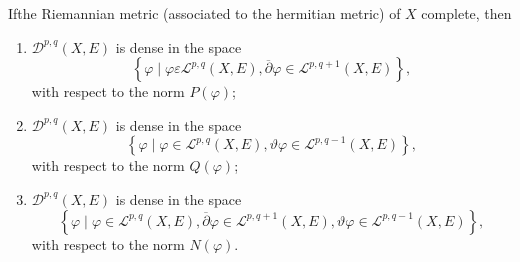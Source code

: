 \setcounter{theorem}{0}
\begin{theorem}\label{chap1:thm1.1}%
  If\pageoriginale the Riemannian metric (associated to the hermitian
  metric) of $X$ complete, then 
  \begin{enumerate}[\rm i)]
  \item $\mathscr{D}^{p,q}(X, E)$ is dense in the space
    $$
    \left\{ \varphi \mid \varphi \varepsilon \mathcal{L}^{p,q} (X,E),
    \overline{\partial}\varphi \in  \mathcal{L}^{p,q+1} (X,E)\right\},
    $$ 
    with respect to the norm $P(\varphi)$;

  \item $\mathscr{D}^{p,q}(X,E)$ is dense in the space
    $$
    \left\{\varphi \mid \varphi \in \mathcal{L}^{p,q}(X,E), \vartheta
    \varphi \in \mathcal{L}^{p,q-1}(X,E)\right\},
    $$ 
    with respect to the norm $Q(\varphi)$;

  \item $\mathscr{D}^{p,q}(X,E)$ is dense in the space
    $$ 
    \left\{\varphi \mid \varphi \in \mathcal{L}^{p,q} (X,E),
     {\overline{\partial}} \varphi \in
     \mathcal{L}^{p,q+1}(X,E), \vartheta \varphi \in
     \mathcal{L}^{p,q-1}(X,E) \right\},
    $$ 
     with respect to the norm $N(\varphi)$.
  \end{enumerate}
\end{theorem}

